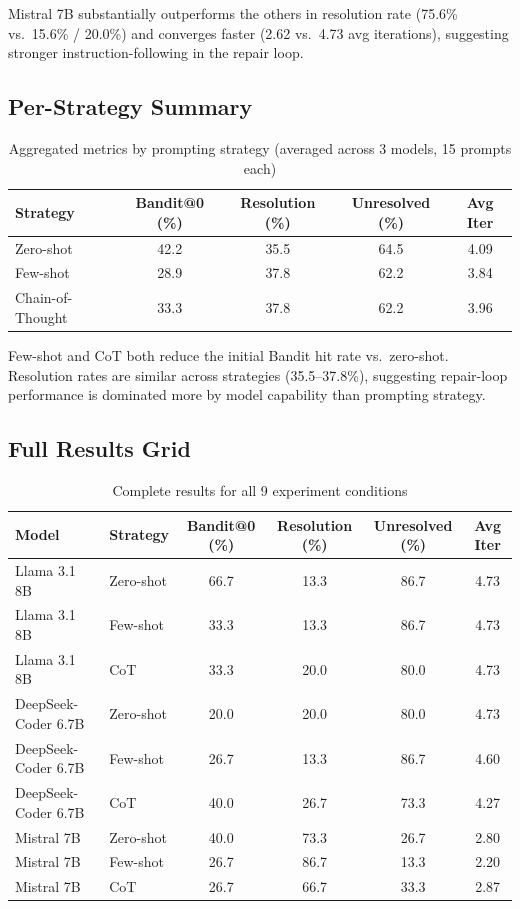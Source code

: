 \documentclass[10pt,a4paper]{article}
\begin{document}
Mistral 7B substantially outperforms the others in resolution rate (75.6\% vs.\ 15.6\% / 20.0\%) and converges faster (2.62 vs.\ 4.73 avg iterations), suggesting stronger instruction-following in the repair loop.

\subsection*{Per-Strategy Summary}

\begin{table}[h]
\centering
\caption{Aggregated metrics by prompting strategy (averaged across 3 models, 15 prompts each)}
\begin{tabular}{lcccc}
\toprule
\textbf{Strategy} & \textbf{Bandit@0 (\%)} & \textbf{Resolution (\%)} & \textbf{Unresolved (\%)} & \textbf{Avg Iter} \\
\midrule
Zero-shot         & 42.2 & 35.5 & 64.5 & 4.09 \\
Few-shot          & 28.9 & 37.8 & 62.2 & 3.84 \\
Chain-of-Thought  & 33.3 & 37.8 & 62.2 & 3.96 \\
\bottomrule
\end{tabular}
\label{tab:strategy_summary}
\end{table}

Few-shot and CoT both reduce the initial Bandit hit rate vs.\ zero-shot. Resolution rates are similar across strategies (35.5–37.8\%), suggesting repair-loop performance is dominated more by model capability than prompting strategy.

\subsection*{Full Results Grid}

\begin{table}[h]
\centering
\caption{Complete results for all 9 experiment conditions}
\begin{tabular}{llcccc}
\toprule
\textbf{Model} & \textbf{Strategy} & \textbf{Bandit@0 (\%)} & \textbf{Resolution (\%)} & \textbf{Unresolved (\%)} & \textbf{Avg Iter} \\
\midrule
Llama 3.1 8B        & Zero-shot  & 66.7 & 13.3 & 86.7 & 4.73 \\
Llama 3.1 8B        & Few-shot   & 33.3 & 13.3 & 86.7 & 4.73 \\
Llama 3.1 8B        & CoT        & 33.3 & 20.0 & 80.0 & 4.73 \\
\midrule
DeepSeek-Coder 6.7B & Zero-shot  & 20.0 & 20.0 & 80.0 & 4.73 \\
DeepSeek-Coder 6.7B & Few-shot   & 26.7 & 13.3 & 86.7 & 4.60 \\
DeepSeek-Coder 6.7B & CoT        & 40.0 & 26.7 & 73.3 & 4.27 \\
\midrule
Mistral 7B          & Zero-shot  & 40.0 & 73.3 & 26.7 & 2.80 \\
Mistral 7B          & Few-shot   & 26.7 & 86.7 & 13.3 & 2.20 \\
Mistral 7B          & CoT        & 26.7 & 66.7 & 33.3 & 2.87 \\
\bottomrule
\end{tabular}
\label{tab:full_results}
\end{table}
\end{document}
